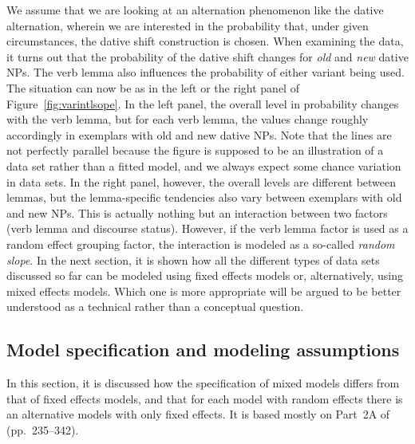 \documentclass[a4paper,12pt]{article}
\begin{document}
We assume that we are looking at an alternation phenomenon like the dative alternation, wherein we are interested in the probability that, under given circumstances, the dative shift construction is chosen.
When examining the data, it turns out that the probability of the dative shift changes for \textit{old} and \textit{new} dative NPs.
The verb lemma also influences the probability of either variant being used.
The situation can now be as in the left or the right panel of Figure~\ref{fig:varintlsope}.
In the left panel, the overall level in probability changes with the verb lemma, but for each verb lemma, the values change roughly accordingly in exemplars with old and new dative NPs.
Note that the lines are not perfectly parallel because the figure is supposed to be an illustration of a data set rather than a fitted model, and we always expect some chance variation in data sets.
In the right panel, however, the overall levels are different between lemmas, but the lemma-specific tendencies also vary between exemplars with old and new NPs.
This is actually nothing but an interaction between two factors (verb lemma and discourse status).
However, if the verb lemma factor is used as a random effect grouping factor, the interaction is modeled as a so-called \textit{random slope}.
In the next section, it is shown how all the different types of data sets discussed so far can be modeled using fixed effects models or, alternatively, using mixed effects models.
Which one is more appropriate will be argued to be better understood as a technical rather than a conceptual question.

\subsection{Model specification and modeling assumptions}
\label{sec:modelspecificationandmodelingassumptions}

In this section, it is discussed how the specification of mixed models differs from that of fixed effects models, and that for each model with random effects there is an alternative models with only fixed effects.
It is based mostly on Part~2A of \citet{GelmanHill2006} (pp.~235--342).
\end{document}
